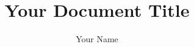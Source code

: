 \documentclass{article}
\begin{document}
\title{Your Document Title}
\author{Your Name}
\date{} %

\maketitle

\thispagestyle{plain} %

\end{document}
